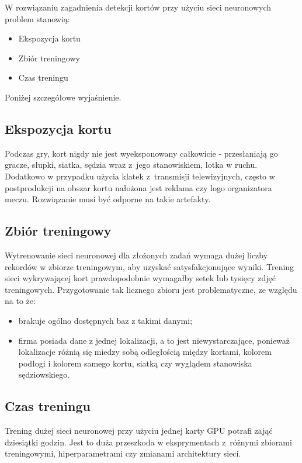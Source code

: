 W rozwiązaniu zagadnienia detekcji kortów przy użyciu sieci neuronowych problem stanowią:

\begin{itemize}
  \item Ekspozycja kortu
  \item Zbiór treningowy
  \item Czas treningu
\end{itemize}

Poniżej szczegółowe wyjaśnienie.

\subsection*{Ekspozycja kortu}

Podczas gry, kort nigdy nie jest wyeksponowany całkowicie - przesłaniają go gracze, słupki, siatka, sędzia wraz z~jego stanowiskiem, lotka w ruchu.
Dodatkowo w przypadku użycia klatek z~transmisji telewizyjnych, często w postprodukcji na obszar kortu nałożona jest reklama czy logo organizatora meczu.
Rozwiązanie musi być odporne na takie artefakty.

\subsection*{Zbiór treningowy}

Wytrenowanie sieci neuronowej dla złożonych zadań wymaga dużej liczby rekordów w zbiorze treningowym, aby uzyskać satysfakcjonujące wyniki.
Trening sieci wykrywającej kort prawdopodobnie wymagałby setek lub tysięcy zdjęć treningowych.
Przygotowanie tak licznego zbioru jest problematyczne, ze względu na to że:

\begin{itemize}
	\item brakuje ogólno dostępnych baz z takimi danymi;
	\item firma posiada dane z jednej lokalizacji, a to jest niewystarczające, ponieważ lokalizacje różnią się miedzy sobą odległością między kortami, kolorem podłogi i kolorem samego kortu, siatką czy wyglądem stanowiska sędziowskiego.
\end{itemize}

\subsection*{Czas treningu}

Trening dużej sieci neuronowej przy użyciu jednej karty GPU potrafi zająć dziesiątki godzin.
Jest to duża przeszkoda w eksprymentach z~różnymi zbiorami treningowymi, hiperparametrami czy zmianami architektury sieci.
